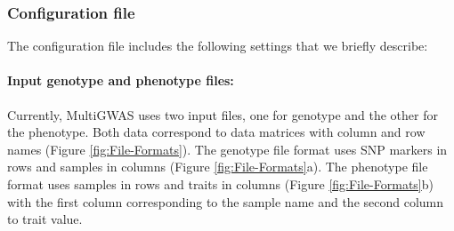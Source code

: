 \subsubsection{Configuration file} 
The configuration file includes the following settings that we briefly describe:%


\paragraph{Input genotype and phenotype files:}
Currently, MultiGWAS uses two input files, one for genotype and the other for the phenotype. Both data correspond to data matrices with column and row names (Figure \ref{fig:File-Formats}). The genotype file format uses SNP markers in rows and samples in columns (Figure \ref{fig:File-Formats}a). The phenotype file format uses samples in rows and traits in columns (Figure \ref{fig:File-Formats}b) with the first column corresponding to the sample name and the second column to trait value.


